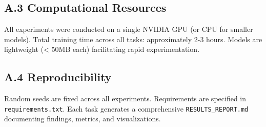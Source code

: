 \documentclass[11pt]{article}
\begin{document}
\subsection*{A.3 Computational Resources}
All experiments were conducted on a single NVIDIA GPU (or CPU for smaller models). Total training time across all tasks: approximately 2-3 hours. Models are lightweight (< 50MB each) facilitating rapid experimentation.

\subsection*{A.4 Reproducibility}
Random seeds are fixed across all experiments. Requirements are specified in \texttt{requirements.txt}. Each task generates a comprehensive \texttt{RESULTS\_REPORT.md} documenting findings, metrics, and visualizations.
\end{document}
